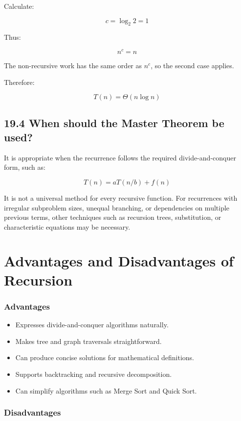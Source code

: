 Calculate:


\[
c=\log_2 2=1
\]


Thus:


\[
n^c=n
\]


The non-recursive work has the same order as $n^c$, so the second case applies.

Therefore:


\[
\boxed{T(n)=\Theta(n\log n)}
\]


\subsection{19.4 When should the Master Theorem be used?}

It is appropriate when the recurrence follows the required divide-and-conquer form, such as:


\[
T(n)=aT(n/b)+f(n)
\]


It is not a universal method for every recursive function. For recurrences with irregular subproblem sizes, unequal branching, or dependencies on multiple previous terms, other techniques such as recursion trees, substitution, or characteristic equations may be necessary.

\section{Advantages and Disadvantages of Recursion}

\subsubsection{Advantages}

\begin{itemize}
    \item Expresses divide-and-conquer algorithms naturally.
    \item Makes tree and graph traversals straightforward.
    \item Can produce concise solutions for mathematical definitions.
    \item Supports backtracking and recursive decomposition.
    \item Can simplify algorithms such as Merge Sort and Quick Sort.
\end{itemize}

\subsubsection{Disadvantages}

